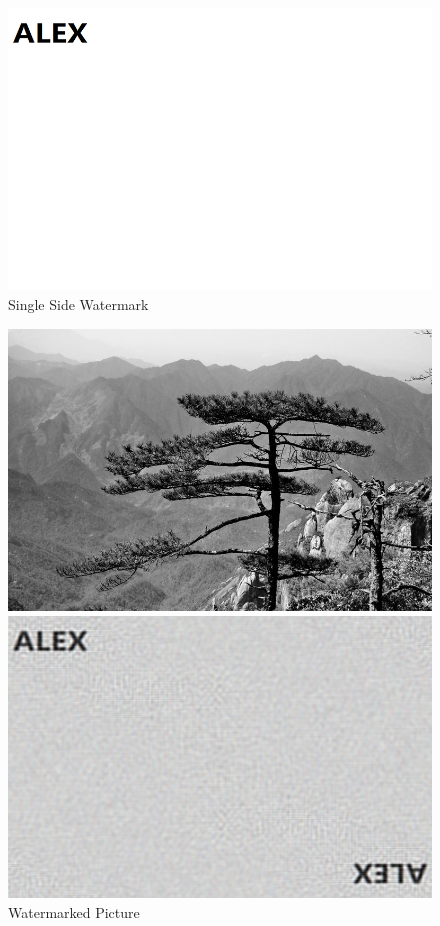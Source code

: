 \documentclass[margin,line]{res}
\begin{document}
\begin{resume}
\begin{figure}[H]
\begin{minipage}{0.5\linewidth}
		\includegraphics[width=\linewidth]{figure/watermark/wm.png}
		\caption*{Single Side Watermark}
	\end{minipage}
\end{figure}
\begin{figure}[H]
	\begin{minipage}{0.5\linewidth}
		\includegraphics[width=\linewidth]{figure/watermark/wmed.png}
		\caption*{Watermarked Picture}
	\end{minipage}
	\begin{minipage}{0.5\linewidth}
		\includegraphics[width=\linewidth]{figure/watermark/re.png}

\end{minipage}
\end{figure}
\end{resume}
\end{document}
